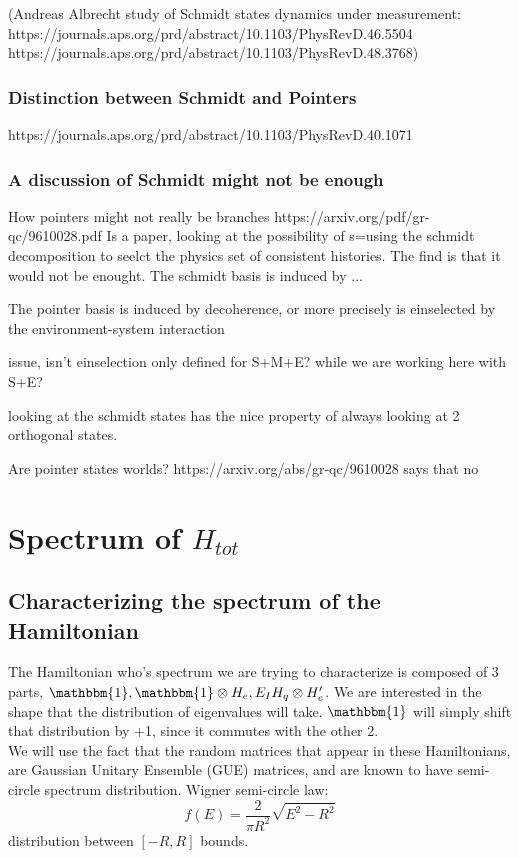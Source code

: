 \documentclass{article}
\begin{document}
(Andreas Albrecht study of Schmidt states dynamics under measurement:
https://journals.aps.org/prd/abstract/10.1103/PhysRevD.46.5504
https://journals.aps.org/prd/abstract/10.1103/PhysRevD.48.3768)

\subsubsection{Distinction between Schmidt and Pointers}
https://journals.aps.org/prd/abstract/10.1103/PhysRevD.40.1071



\subsubsection{A discussion of Schmidt might not be enough}
How pointers might not really be branches https://arxiv.org/pdf/gr-qc/9610028.pdf
Is a paper, looking at the possibility of s=using the schmidt decomposition to seelct the physics set of consistent histories. The find is that it would not be enought.
The schmidt basis is induced by ...

The pointer basis is induced by decoherence, or more precisely is einselected by the environment-system interaction

issue, isn't einselection only defined for S+M+E? while we are working here with S+E?

looking at the schmidt states has the nice property of always looking at 2 orthogonal states.

Are pointer states worlds? https://arxiv.org/abs/gr-qc/9610028 says that no

\appendix

\section{Spectrum of $H_{tot}$}


\subsection{Characterizing the spectrum of the Hamiltonian}
The Hamiltonian who's spectrum we are trying to characterize is composed of 3 parts, $\mathbbm{1}, \mathbbm{1}\otimes H_e,E_IH_q\otimes H_e'$. We are interested in the shape that the distribution of eigenvalues will take. $\mathbbm{1}$ will simply shift that distribution by +1, since it commutes with the other 2. \\

We will use the fact that the random matrices that appear in these Hamiltonians, are Gaussian Unitary Ensemble (GUE) matrices, and are known to have semi-circle spectrum distribution.
Wigner semi-circle law:
\begin{equation}
    f(E)=\frac{2}{\pi R^2}\sqrt{E^2-R^2}
\end{equation}
distribution between $[-R,R]$ bounds.\\
\end{document}
